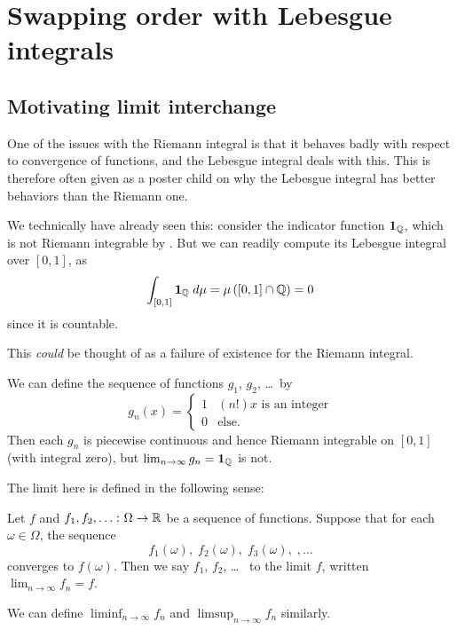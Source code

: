 \chapter{Swapping order with Lebesgue integrals}
\section{Motivating limit interchange}

One of the issues with the Riemann integral is
that it behaves badly with respect to convergence of functions,
and the Lebesgue integral deals with this.
This is therefore often given as a poster child
on why the Lebesgue integral has better behaviors than the Riemann one.

We technically have already seen this:
consider the indicator function $\mathbf{1}_\mathbb Q$,
which is not Riemann integrable by .
But we can readily compute its Lebesgue integral over $[0,1]$, as
\[ \int_{[0,1]} \mathbf{1}_\mathbb Q \; d\mu
	= \mu\left( [0,1] \cap \mathbb Q \right) = 0 \]
since it is countable.

This \emph{could} be thought of as a failure of existence
for the Riemann integral.
\begin{example}
	\label{ex:1QQindicator}
	We can define the sequence of functions $g_1$, $g_2$, \dots\ by
	\[ g_n(x) = \begin{cases}
			1 & (n!)x \text{ is an integer} \\
			0 & \text{else}.
		\end{cases} \]
	Then each $g_n$ is piecewise continuous
	and hence Riemann integrable on $[0,1]$ (with integral zero),
	but $\lim_{n \to \infty} g_n = \mathbf{1}_\mathbb Q$ is not.
\end{example}

The limit here is defined in the following sense:
\begin{definition}
	Let $f$ and $f_1, f_2, \dots \colon \Omega \to \mathbb R$ be a sequence of functions.
	Suppose that for each $\omega \in \Omega$, the sequence
	\[ f_1(\omega), \; f_2(\omega), \; f_3(\omega), \;, \dots \]
	converges to $f(\omega)$.
	Then we say $f_1$, $f_2$, \dots\ 
	to the limit $f$, written $\lim_{n \to \infty} f_n = f$.

	We can define $\liminf_{n \to \infty} f_n$
	and $\limsup_{n \to \infty} f_n$ similarly.
\end{definition}

